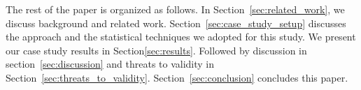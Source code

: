 

	

The rest of the paper is organized as follows. In Section~\ref{sec:related_work}, we discuss background and related work. Section~\ref{sec:case_study_setup} discusses the approach and the statistical techniques we adopted for this study. We present our case study results in Section\ref{sec:results}. Followed by discussion in section~\ref{sec:discussion} and threats to validity in Section~\ref{sec:threats_to_validity}. Section~\ref{sec:conclusion} concludes this paper.
